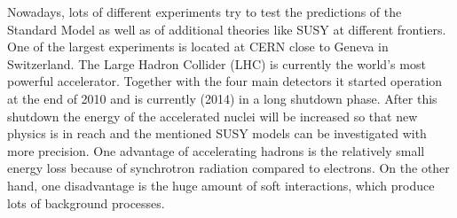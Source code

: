 Nowadays, lots of different experiments try to test the predictions of the Standard Model as well as of additional theories like SUSY at different frontiers. One of the largest experiments is located at CERN close to Geneva in Switzerland. The Large Hadron Collider (LHC) is currently the world's most powerful accelerator. Together with the four main detectors it started operation at the end of 2010 and is currently (2014) in a long shutdown phase. After this shutdown the energy of the accelerated nuclei will be increased so that new physics is in reach and the mentioned SUSY models can be investigated with more precision. One advantage of accelerating hadrons is the relatively small energy loss because of synchrotron radiation compared to electrons. On the other hand, one disadvantage is the huge amount of soft interactions, which produce lots of background processes.

